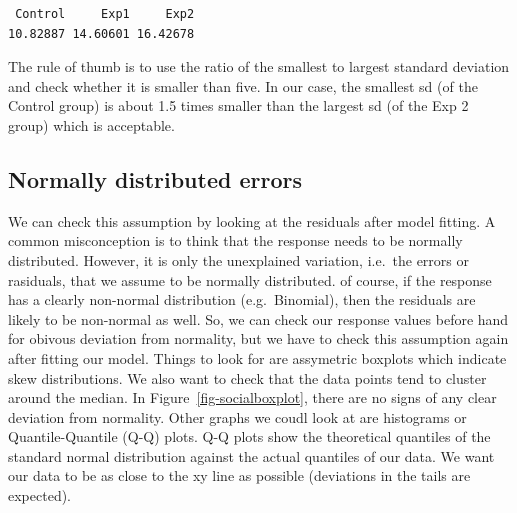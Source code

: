 \documentclass[
  letterpaper,
  DIV=11,
  numbers=noendperiod,
  oneside]{scrreprt}
\newenvironment{Shaded}{\begin{snugshade}}{\end{snugshade}}
\newcommand{\AttributeTok}[1]{\textcolor[rgb]{0.40,0.45,0.13}{#1}}
\newcommand{\DecValTok}[1]{\textcolor[rgb]{0.68,0.00,0.00}{#1}}
\newcommand{\FunctionTok}[1]{\textcolor[rgb]{0.28,0.35,0.67}{#1}}
\newcommand{\NormalTok}[1]{\textcolor[rgb]{0.00,0.23,0.31}{#1}}
\newcommand{\SpecialCharTok}[1]{\textcolor[rgb]{0.37,0.37,0.37}{#1}}
\newcommand{\StringTok}[1]{\textcolor[rgb]{0.13,0.47,0.30}{#1}}
\begin{document}
\begin{verbatim}
 Control     Exp1     Exp2 
10.82887 14.60601 16.42678 
\end{verbatim}

The rule of thumb is to use the ratio of the smallest to largest
standard deviation and check whether it is smaller than five. In our
case, the smallest sd (of the Control group) is about 1.5 times smaller
than the largest sd (of the Exp 2 group) which is acceptable.

\subsection*{Normally distributed
errors}\label{normally-distributed-errors}

We can check this assumption by looking at the residuals after model
fitting. A common misconception is to think that the response needs to
be normally distributed. However, it is only the unexplained variation,
i.e.~the errors or rasiduals, that we assume to be normally distributed.
of course, if the response has a clearly non-normal distribution
(e.g.~Binomial), then the residuals are likely to be non-normal as well.
So, we can check our response values before hand for obivous deviation
from normality, but we have to check this assumption again after fitting
our model. Things to look for are assymetric boxplots which indicate
skew distributions. We also want to check that the data points tend to
cluster around the median. In Figure~\ref{fig-socialboxplot}, there are
no signs of any clear deviation from normality. Other graphs we coudl
look at are histograms or Quantile-Quantile (Q-Q) plots. Q-Q plots show
the theoretical quantiles of the standard normal distribution against
the actual quantiles of our data. We want our data to be as close to the
xy line as possible (deviations in the tails are expected).

\begin{Shaded}
\end{Shaded}
\end{document}
